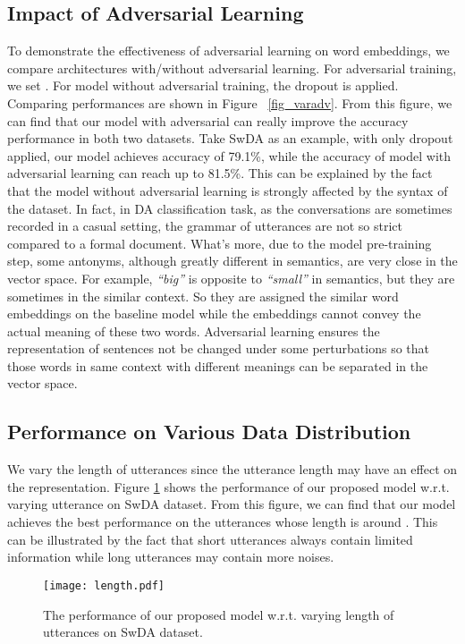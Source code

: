 \documentclass[conference]{IEEEtran}
\begin{document}
	\subsection{Impact of Adversarial Learning}
	To demonstrate the effectiveness of adversarial learning on word embeddings, we compare architectures with/without adversarial learning. For adversarial training, we set . For model without adversarial training, the dropout is applied. Comparing performances are shown in Figure ~\ref{fig_varadv}. From this figure, we can find that our model with adversarial can really improve the accuracy performance in both two datasets. Take SwDA as an example, with only dropout applied, our model achieves accuracy of 79.1\%, while the accuracy of model with adversarial learning can reach up to 81.5\%. This can be explained by the fact that the model without adversarial learning is strongly affected by the syntax of the dataset. In fact, in DA classification task, as the conversations are sometimes recorded in a casual setting, the grammar of utterances are not so strict compared to a formal document. What's more, due to the model pre-training step, some antonyms, although greatly different in semantics, are very close in the vector space. For example, \emph{``big''} is opposite to \emph{``small''} in semantics, but they are sometimes in the similar context. So they are assigned the similar word embeddings on the baseline model while the embeddings cannot convey the actual meaning of these two words. Adversarial learning ensures the representation of sentences not be changed under some perturbations so that those words in same context with different meanings can be separated in the vector space.
	
	\subsection{Performance on Various Data Distribution}
	We vary the length of utterances since the utterance length may have an effect on the representation. Figure \ref{fig_var_length_performance} shows the performance of our proposed model w.r.t. varying utterance on SwDA dataset. From this figure, we can find that our model achieves the best performance on the utterances whose length is around . This can be illustrated by the fact that short utterances always contain limited information while long utterances may contain more noises.
	
	\begin{figure}[!t]
		\centering
		\texttt{[image: length.pdf]}
		\caption{The performance of our proposed model w.r.t. varying length of utterances on SwDA dataset.}
		\label{fig_var_length_performance}
	\end{figure}
	
\end{document}
